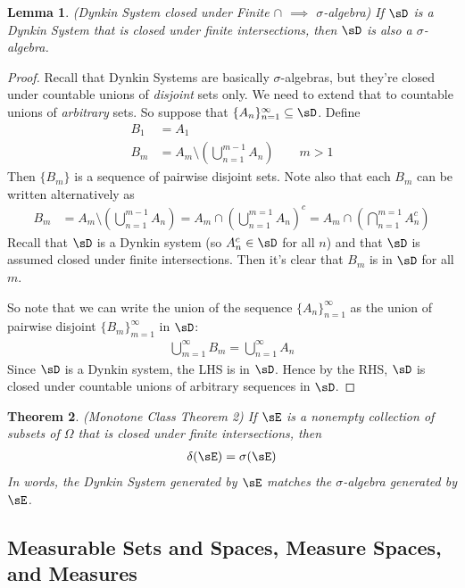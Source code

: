 \documentclass[12pt]{article}
\theoremstyle{plain}
\newtheorem{thm}{Theorem}[section]
\newtheorem{lem}[thm]{Lemma}
\theoremstyle{definition}
\theoremstyle{remark}
\newcommand{\ninf}{_{n=1}^\infty}
\newcommand{\minf}{_{m=1}^\infty}
\begin{document}
\clearpage
\begin{lem}
\label{lem:dynkin-closed}
\emph{(Dynkin System closed under Finite $\cap$ $\implies$ $\sigma$-algebra)}
If $\sD$ is a Dynkin System that is closed under finite intersections,
then $\sD$ is also a $\sigma$-algebra.
\end{lem}
\begin{proof}
Recall that Dynkin Systems are basically $\sigma$-algebras, but they're
closed under countable unions of \emph{disjoint} sets only. We need to
extend that to countable unions of \emph{arbitrary} sets. So suppose
that $\{A_n\}\ninf\subseteq \sD$. Define
\begin{align*}
  B_1 &= A_1 \\
  B_m &= A_m \setminus \left( \bigcup_{n=1}^{m-1} A_n\right)
  \qquad m>1
\end{align*}
Then $\{B_m\}$ is a sequence of pairwise disjoint sets. Note also that
each $B_m$ can be written alternatively as
\begin{align*}
  B_m &= A_m \setminus \left( \bigcup_{n=1}^{m-1} A_n\right)
  = A_m \cap \left( \bigcup^{m=1}_{n=1}A_n\right)^c
  = A_m \cap \left( \bigcap^{m=1}_{n=1}A_n^c\right)
\end{align*}
Recall that $\sD$ is a Dynkin system (so $A^c_n\in \sD$ for all $n$) and
that $\sD$ is assumed closed under finite intersections. Then it's clear
that $B_m$ is in $\sD$ for all $m$.

So note that we can write the union of the sequence $\{A_n\}\ninf$ as
the union of pairwise disjoint $\{B_m\}_{m=1}^\infty$ in $\sD$:
\begin{align*}
  \bigcup\minf B_m = \bigcup\ninf A_n
\end{align*}
Since $\sD$ is a Dynkin system, the LHS is in $\sD$. Hence by the RHS,
$\sD$ is closed under countable unions of arbitrary sequences in $\sD$.
\end{proof}

\begin{thm}\emph{(Monotone Class Theorem 2)}
\label{thm:mct-2}
If $\sE$ is a nonempty collection of subsets of $\Omega$ that is closed
under finite intersections, then
\begin{align*}
  \delta(\sE)=\sigma(\sE)
\end{align*}
In words, the Dynkin System generated by $\sE$ matches the
$\sigma$-algebra generated by $\sE$.
\end{thm}

\clearpage
\subsection{Measurable Sets and Spaces, Measure Spaces, and Measures}
\end{document}
